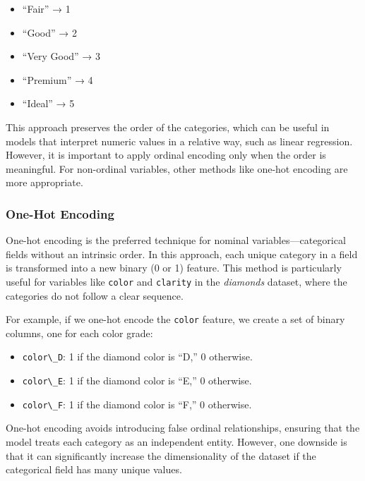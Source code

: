 \documentclass[
]{book}
\newcommand{\passthrough}[1]{#1}
\providecommand{\tightlist}{%
  \setlength{\itemsep}{0pt}\setlength{\parskip}{0pt}}
\theoremstyle{definition}
\theoremstyle{definition}
\theoremstyle{definition}
\theoremstyle{definition}
\theoremstyle{remark}
\begin{document}
\begin{itemize}
\tightlist
\item
  ``Fair'' → 1
\item
  ``Good'' → 2
\item
  ``Very Good'' → 3
\item
  ``Premium'' → 4
\item
  ``Ideal'' → 5
\end{itemize}

This approach preserves the order of the categories, which can be useful in models that interpret numeric values in a relative way, such as linear regression. However, it is important to apply ordinal encoding only when the order is meaningful. For non-ordinal variables, other methods like one-hot encoding are more appropriate.

\subsubsection*{One-Hot Encoding}\label{one-hot-encoding}

One-hot encoding is the preferred technique for nominal variables---categorical fields without an intrinsic order. In this approach, each unique category in a field is transformed into a new binary (0 or 1) feature. This method is particularly useful for variables like \passthrough{\lstinline!color!} and \passthrough{\lstinline!clarity!} in the \emph{diamonds} dataset, where the categories do not follow a clear sequence.

For example, if we one-hot encode the \passthrough{\lstinline!color!} feature, we create a set of binary columns, one for each color grade:

\begin{itemize}
\tightlist
\item
  \passthrough{\lstinline!color\_D!}: 1 if the diamond color is ``D,'' 0 otherwise.
\item
  \passthrough{\lstinline!color\_E!}: 1 if the diamond color is ``E,'' 0 otherwise.
\item
  \passthrough{\lstinline!color\_F!}: 1 if the diamond color is ``F,'' 0 otherwise.
\end{itemize}

One-hot encoding avoids introducing false ordinal relationships, ensuring that the model treats each category as an independent entity. However, one downside is that it can significantly increase the dimensionality of the dataset if the categorical field has many unique values.
\end{document}
